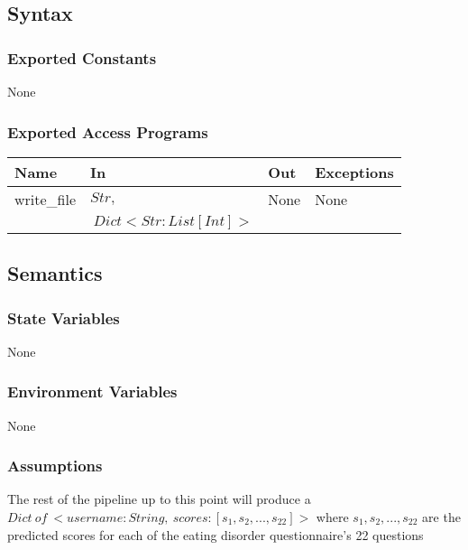 \documentclass[12pt, titlepage]{article}
\begin{document}
\subsection{Syntax}

\subsubsection{Exported Constants}

None

\subsubsection{Exported Access Programs}

\begin{center}
\begin{tabular}{p{2cm} p{6cm} p{2cm} p{3cm}}
\hline
\textbf{Name} & \textbf{In} & \textbf{Out} & \textbf{Exceptions} \\
\hline
write\_file & $Str,\ $ & None & None \\
& $\ Dict<Str:List[Int]>$ &  &  \\
\hline

\end{tabular}
\end{center}

\subsection{Semantics}

\subsubsection{State Variables}

None

\subsubsection{Environment Variables}

None

\subsubsection{Assumptions}

The rest of the pipeline up to this point will produce a $Dict\ of\ <username: String,\ scores: [s_1, s_2, ..., s_{22}]>$ where $s_1, s_2, ..., s_{22}$ are the predicted scores for each of the eating disorder questionnaire's 22 questions
\end{document}
